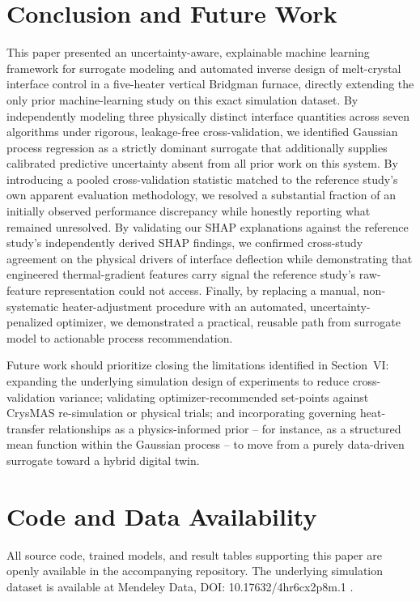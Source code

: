 \documentclass[conference]{IEEEtran}
\begin{document}
\section{Conclusion and Future Work}
This paper presented an uncertainty-aware, explainable machine learning framework for surrogate modeling and automated inverse design of melt-crystal interface control in a five-heater vertical Bridgman furnace, directly extending the only prior machine-learning study on this exact simulation dataset. By independently modeling three physically distinct interface quantities across seven algorithms under rigorous, leakage-free cross-validation, we identified Gaussian process regression as a strictly dominant surrogate that additionally supplies calibrated predictive uncertainty absent from all prior work on this system. By introducing a pooled cross-validation statistic matched to the reference study's own apparent evaluation methodology, we resolved a substantial fraction of an initially observed performance discrepancy while honestly reporting what remained unresolved. By validating our SHAP explanations against the reference study's independently derived SHAP findings, we confirmed cross-study agreement on the physical drivers of interface deflection while demonstrating that engineered thermal-gradient features carry signal the reference study's raw-feature representation could not access. Finally, by replacing a manual, non-systematic heater-adjustment procedure with an automated, uncertainty-penalized optimizer, we demonstrated a practical, reusable path from surrogate model to actionable process recommendation.

Future work should prioritize closing the limitations identified in Section~VI: expanding the underlying simulation design of experiments to reduce cross-validation variance; validating optimizer-recommended set-points against CrysMAS re-simulation or physical trials; and incorporating governing heat-transfer relationships as a physics-informed prior -- for instance, as a structured mean function within the Gaussian process -- to move from a purely data-driven surrogate toward a hybrid digital twin.

\section*{Code and Data Availability}
All source code, trained models, and result tables supporting this paper are openly available in the accompanying repository. The underlying simulation dataset is available at Mendeley Data, DOI: 10.17632/4hr6cx2p8m.1 \cite{zhang_mendeley}.
\end{document}
